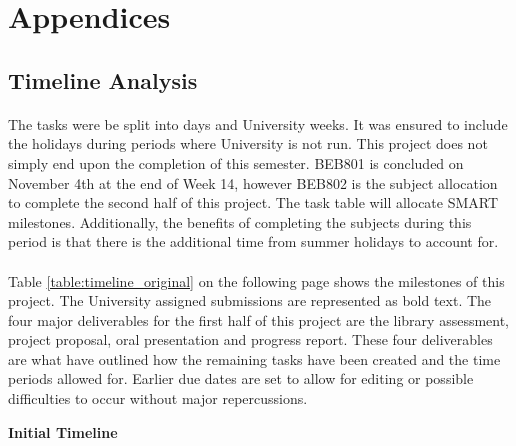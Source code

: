 \section{Appendices}


\subsection{Timeline Analysis} \label{appendix:Timeline}

\paragraph{}
The tasks were be split into days and University weeks. It was ensured to include the holidays during periods where University is not run. This project does not simply end upon the completion of this semester. BEB801 is concluded on November 4th at the end of Week 14, however BEB802 is the subject allocation to complete the second half of this project. The task table will allocate SMART milestones. Additionally, the benefits of completing the subjects during this period is that there is the additional time from summer holidays to account for.

\paragraph{}
Table \ref{table:timeline_original} on the following page shows the milestones of this project. The University assigned submissions are represented as bold text. The four major deliverables for the first half of this project are the library assessment, project proposal, oral presentation and progress report. These four deliverables are what have outlined how the remaining tasks have been created and the time periods allowed for. Earlier due dates are set to allow for editing or possible difficulties to occur without major repercussions. 

\newpage
\textbf{Initial Timeline}

